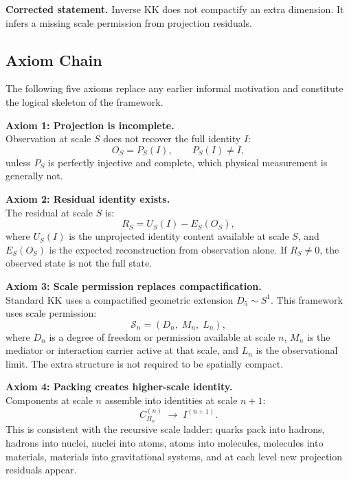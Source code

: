 \documentclass[11pt,a4paper]{article}
\begin{document}
\medskip
\begin{keybox}
\textbf{Corrected statement.}\quad
Inverse KK does not compactify an extra dimension.
It infers a missing scale permission from projection residuals.
\end{keybox}

\subsection{Axiom Chain}
\label{sec:axioms}

The following five axioms replace any earlier informal motivation and
constitute the logical skeleton of the framework.

\medskip
\noindent\textbf{Axiom 1: Projection is incomplete.}\\
Observation at scale $S$ does not recover the full identity $I$:
\[
  O_S = P_S(I) , \qquad P_S(I) \neq I ,
\]
unless $P_S$ is perfectly injective and complete, which physical measurement
is generally not.

\medskip
\noindent\textbf{Axiom 2: Residual identity exists.}\\
The residual at scale $S$ is:
\[
  R_S = U_S(I) - E_S(O_S) ,
\]
where $U_S(I)$ is the unprojected identity content available at scale $S$,
and $E_S(O_S)$ is the expected reconstruction from observation alone.
If $R_S \neq 0$, the observed state is not the full state.

\medskip
\noindent\textbf{Axiom 3: Scale permission replaces compactification.}\\
Standard KK uses a compactified geometric extension $D_5 \sim S^1$.
This framework uses scale permission:
\[
  \mathcal{S}_n = (D_n,\; M_n,\; L_n) ,
\]
where $D_n$ is a degree of freedom or permission available at scale $n$,
$M_n$ is the mediator or interaction carrier active at that scale, and
$L_n$ is the observational limit.  The extra structure is not required to
be spatially compact.

\medskip
\noindent\textbf{Axiom 4: Packing creates higher-scale identity.}\\
Components at scale $n$ assemble into identities at scale $n+1$:
\[
  C^{(n)}_{\Pi_n} \;\longrightarrow\; I^{(n+1)} .
\]
This is consistent with the recursive scale ladder: quarks pack into
hadrons, hadrons into nuclei, nuclei into atoms, atoms into molecules,
molecules into materials, materials into gravitational systems, and at each
level new projection residuals appear.
\end{document}
